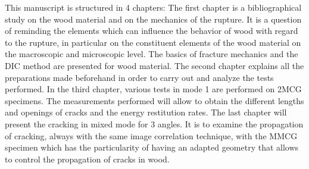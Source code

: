 This manuscript is structured in 4 chapters: 
The first chapter is a bibliographical study on the wood material and on the mechanics of the rupture. It is a question of reminding the elements which can influence the behavior of wood with regard to the rupture, in particular on the constituent elements of the wood material on the macroscopic and microscopic level. The basics of fracture mechanics and the DIC method are presented for wood material.
The second chapter explains all the preparations made beforehand in order to carry out and analyze the tests performed.
In the third chapter, various tests in mode 1 are performed on 2MCG specimens. The measurements performed will allow to obtain the different lengths and openings of cracks and the energy restitution rates.
The last chapter will present the cracking in mixed mode for 3 angles. It is to examine the propagation of cracking, always with the same image correlation technique, with the MMCG specimen which has the particularity of having an adapted geometry that allows to control the propagation of cracks in wood.

